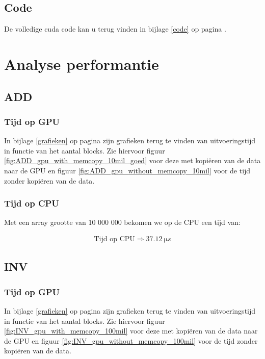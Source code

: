 \documentclass[twoside,a4paper]{article}
\begin{document}
\subsection{Code}
De volledige cuda code kan u terug vinden in bijlage \ref{code} op pagina \pageref{code}.

\section{Analyse performantie}

\subsection{ADD}
\subsubsection{Tijd op GPU}
In bijlage \ref{grafieken} op pagina \pageref{grafieken} zijn grafieken terug te vinden van uitvoeringstijd in functie van het aantal blocks.
Zie hiervoor figuur \ref{fig:ADD_gpu_with_memcopy_10mil_goed} voor deze met kopi\"eren van de data naar de GPU en figuur \ref{fig:ADD_gpu_without_memcopy_10mil} voor de tijd zonder kopi\"eren van de data.


\subsubsection{Tijd op CPU}
Met een array grootte van 10 000 000 bekomen we op de CPU een tijd van:

\begin{align*}
    \text{Tijd op CPU} \Rightarrow \SI{37.12}{\micro s}
\end{align*}


\subsection{INV}
\subsubsection{Tijd op GPU}
In bijlage \ref{grafieken} op pagina \pageref{grafieken} zijn grafieken terug te vinden van uitvoeringstijd in functie van het aantal blocks.
Zie hiervoor figuur \ref{fig:INV_gpu_with_memcopy_100mil} voor deze met kopi\"eren van de data naar de GPU en figuur \ref{fig:INV_gpu_without_memcopy_100mil} voor de tijd zonder kopi\"eren van de data.
\end{document}
